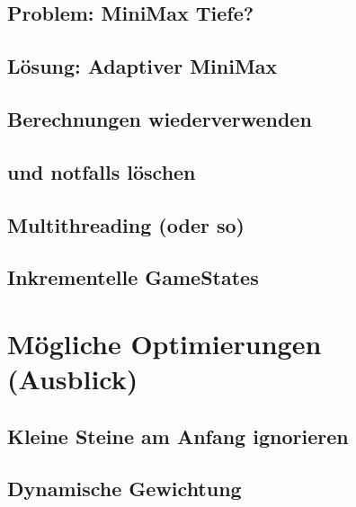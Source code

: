 \documentclass[12pt]{beamer}
\begin{document}
\subsection{Problem: MiniMax Tiefe?} \begin{frame}\end{frame}
\subsection{Lösung: Adaptiver MiniMax} \begin{frame}\end{frame}
\subsection{Berechnungen wiederverwenden} \begin{frame}\end{frame}
\subsection{und notfalls löschen} \begin{frame}\end{frame}
\subsection{Multithreading (oder so)} \begin{frame}\end{frame}
\subsection{Inkrementelle GameStates} \begin{frame}\end{frame}


\section{Mögliche Optimierungen (Ausblick)}
\subsection{Kleine Steine am Anfang ignorieren} \begin{frame}\end{frame}
\subsection{Dynamische Gewichtung} \begin{frame}\end{frame}
\end{document}

